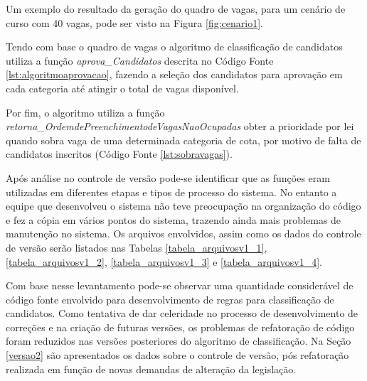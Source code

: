 Um exemplo do resultado da geração do quadro de vagas, para um cenário de curso com 40 vagas,  pode ser visto na Figura \ref{fig:cenario1}.



\newpage
Tendo com base o quadro de vagas o algoritmo de classificação de candidatos utiliza a função \textit{aprova\_Candidatos} descrita no Código Fonte \ref{lst:algoritmoaprovacao}, fazendo a seleção dos candidatos para aprovação em cada categoria até atingir o total de vagas disponível. 



Por fim, o algoritmo utiliza a função \textit{retorna\_OrdemdePreenchimentodeVagasNaoOcupadas} obter a prioridade por lei quando sobra vaga de uma determinada categoria de cota, por motivo de falta de candidatos inscritos (Código Fonte \ref{lst:sobravagas}).



Após análise no controle de versão pode-se identificar que as funções eram utilizadas em diferentes etapas e tipos de processo do sistema. No entanto a equipe que desenvolveu o sistema não teve preocupação na organização do código e fez a cópia em vários pontos do sistema, trazendo ainda mais problemas de manutenção no sistema. Os arquivos envolvidos, assim como os dados do controle de versão serão listados nas Tabelas \ref{tabela_arquivosv1_1}, \ref{tabela_arquivosv1_2}, \ref{tabela_arquivosv1_3} e \ref{tabela_arquivosv1_4}.




Com base nesse levantamento pode-se observar uma quantidade considerável de código fonte envolvido para desenvolvimento de regras para classificação de candidatos. Como tentativa de dar celeridade no processo de desenvolvimento de correções e na criação de futuras versões, os problemas de refatoração de código foram reduzidos nas versões posteriores do algoritmo de classificação. Na Seção \ref{versao2} são apresentados os dados sobre o controle de versão, pós refatoração realizada em função de novas demandas de alteração da legislação.
